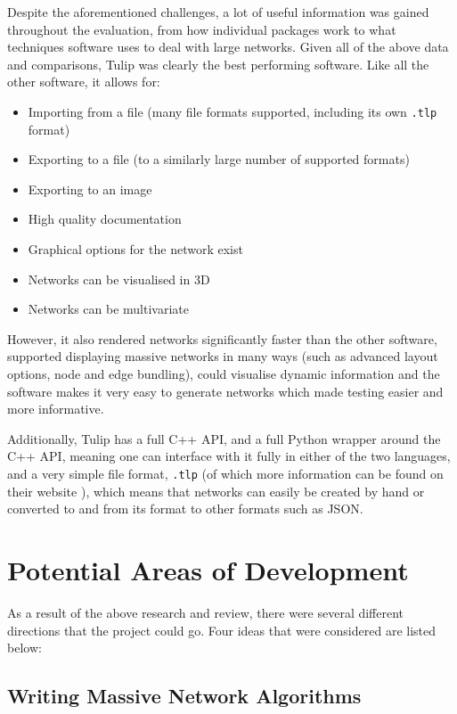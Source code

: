 \documentclass[../dissertation.tex]{subfiles}
\begin{document}
Despite the aforementioned challenges, a lot of useful information was gained throughout the evaluation, from how individual packages work to what techniques software uses to deal with large networks. Given all of the above data and comparisons, Tulip was clearly the best performing software. Like all the other software, it allows for:
\begin{itemize}
    \item Importing from a file (many file formats supported, including its own \texttt{.tlp} format)
    \item Exporting to a file (to a similarly large number of supported formats)
    \item Exporting to an image
    \item High quality documentation
    \item Graphical options for the network exist
    \item Networks can be visualised in 3D
    \item Networks can be multivariate
\end{itemize}

However, it also rendered networks significantly faster than the other software, supported displaying massive networks in many ways (such as advanced layout options, node and edge bundling), could visualise dynamic information and the software makes it very easy to generate networks which made testing easier and more informative. 

Additionally, Tulip has a full C++ API, and a full Python wrapper around the C++ API, meaning one can interface with it fully in either of the two languages, and a very simple file format, \texttt{.tlp} (of which more information can be found on their website \cite{tuliptlp}), which means that networks can easily be created by hand or converted to and from its format to other formats such as JSON.

\section{Potential Areas of Development}

As a result of the above research and review, there were several different directions that the project could go. Four ideas that were considered are listed below:

\subsection{Writing Massive Network Algorithms}
\end{document}
